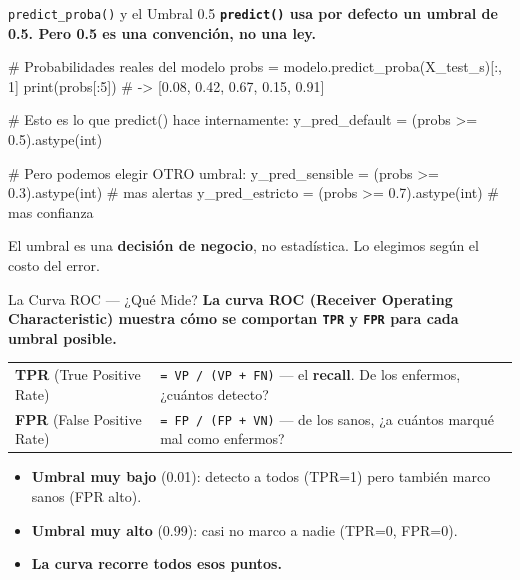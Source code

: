 \documentclass[aspectratio=169, 11pt]{beamer}
\begin{document}
\begin{frame}[fragile,shrink=10]{\texttt{predict\_proba()} y el Umbral 0.5}
  \vspace{-4pt}
  {\footnotesize\color{arcaDark}\bfseries
    \texttt{predict()} usa por defecto un umbral de \textbf{0.5}.
    Pero 0.5 es una convención, no una ley.}

  \vspace{4pt}
  \begin{pyblock}
# Probabilidades reales del modelo
probs = modelo.predict_proba(X_test_s)[:, 1]
print(probs[:5])
# -> [0.08, 0.42, 0.67, 0.15, 0.91]

# Esto es lo que predict() hace internamente:
y_pred_default = (probs >= 0.5).astype(int)

# Pero podemos elegir OTRO umbral:
y_pred_sensible = (probs >= 0.3).astype(int)   # mas alertas
y_pred_estricto = (probs >= 0.7).astype(int)   # mas confianza
  \end{pyblock}

  \vspace{2pt}
  {\scriptsize\color{arcaDark}
    \faKey\hspace{4pt} El umbral es una \textbf{decisión de negocio}, no
    estadística. Lo elegimos según el costo del error.}
\end{frame}

\begin{frame}{La Curva ROC --- ¿Qué Mide?}
  \vspace{-4pt}
  {\footnotesize\color{arcaDark}\bfseries
    La curva \textbf{ROC} (Receiver Operating Characteristic) muestra cómo
    se comportan \texttt{TPR} y \texttt{FPR} para \textbf{cada umbral posible}.}

  \vspace{6pt}
  {\scriptsize
  \begin{tabular}{@{}lp{9cm}@{}}
    \toprule
    \textbf{TPR} (True Positive Rate) & \texttt{= VP / (VP + FN)} --- el \textbf{recall}. De los enfermos, ¿cuántos detecto? \\
    \textbf{FPR} (False Positive Rate) & \texttt{= FP / (FP + VN)} --- de los sanos, ¿a cuántos marqué mal como enfermos? \\
    \bottomrule
  \end{tabular}
  }

  \vspace{8pt}
  {\footnotesize
  \begin{itemize}\setlength{\itemsep}{4pt}
    \item[{\color{arcaRed}\scriptsize\faArrowRight}]
      \textbf{Umbral muy bajo} (0.01): detecto a todos (TPR=1) pero también
      marco sanos (FPR alto).
    \item[{\color{arcaRed}\scriptsize\faArrowRight}]
      \textbf{Umbral muy alto} (0.99): casi no marco a nadie (TPR=0, FPR=0).
    \item[{\color{arcaRed}\scriptsize\faArrowRight}]
      \textbf{La curva recorre todos esos puntos.}
  \end{itemize}
  }
\end{frame}
\end{document}

